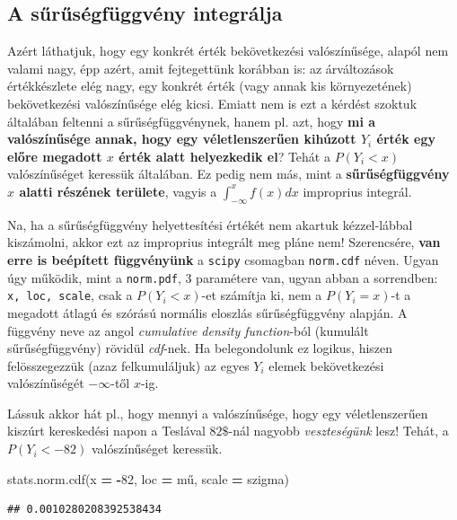 \documentclass[
]{book}
\newenvironment{Shaded}{\begin{snugshade}}{\end{snugshade}}
\newcommand{\DecValTok}[1]{\textcolor[rgb]{0.00,0.00,0.81}{#1}}
\newcommand{\NormalTok}[1]{#1}
\newcommand{\OperatorTok}[1]{\textcolor[rgb]{0.81,0.36,0.00}{\textbf{#1}}}
\begin{document}
\subsection{A sűrűségfüggvény integrálja}\label{a-sux171rux171suxe9gfuxfcggvuxe9ny-integruxe1lja}

Azért láthatjuk, hogy egy konkrét érték bekövetkezési valószínűsége, alapól nem valami nagy, épp azért, amit fejtegettünk korábban is: az árváltozások értékkészlete elég nagy, egy konkrét érték (vagy annak kis környezetének) bekövetkezési valószínűsége elég kicsi.
Emiatt nem is ezt a kérdést szoktuk általában feltenni a sűrűségfüggvénynek, hanem pl. azt, hogy \textbf{mi a valószínűsége annak, hogy egy véletlenszerűen kihúzott \(Y_i\) érték egy előre megadott \(x\) érték alatt helyezkedik el}? Tehát a \(P(Y_i < x)\) valószínűséget keressük általában.
Ez pedig nem más, mint a \textbf{sűrűségfüggvény \(x\) alatti részének területe}, vagyis a \(\int_{-\infty}^x{f(x)}dx\) improprius integrál.

Na, ha a sűrűségfüggvény helyettesítési értékét nem akartuk kézzel-lábbal kiszámolni, akkor ezt az improprius integrált meg pláne nem!
Szerencsére, \textbf{van erre is beépített függvényünk} a \texttt{scipy} csomagban \texttt{norm.cdf} néven. Ugyan úgy működik, mint a \texttt{norm.pdf}, 3 paramétere van, ugyan abban a sorrendben: \texttt{x,\ loc,\ scale}, csak a \(P(Y_i < x)\)-et számítja ki, nem a \(P(Y_i = x)\)-t a megadott átlagú és szórású normális eloszlás sűrűségfüggvény alapján. A függvény neve az angol \emph{cumulative density function}-ból (kumulált sűrűségfüggvény) rövidül \emph{cdf}-nek. Ha belegondolunk ez logikus, hiszen felösszegezzük (azaz felkumuláljuk) az egyes \(Y_i\) elemek bekövetkezési valószínűségét \(-\infty\)-től \(x\)-ig.

Lássuk akkor hát pl., hogy mennyi a valószínűsége, hogy egy véletlenszerűen kiszúrt kereskedési napon a Teslával \(82\$\)-nál nagyobb \emph{veszteségünk} lesz! Tehát, a \(P(Y_i<-82)\) valószínűséget keressük.

\begin{Shaded}
\begin{Highlighting}[]
\NormalTok{stats.norm.cdf(x }\OperatorTok{=} \OperatorTok{{-}}\DecValTok{82}\NormalTok{, loc }\OperatorTok{=}\NormalTok{ mű, scale }\OperatorTok{=}\NormalTok{ szigma)}
\end{Highlighting}
\end{Shaded}

\begin{verbatim}
## 0.0010280208392538434
\end{verbatim}
\end{document}
